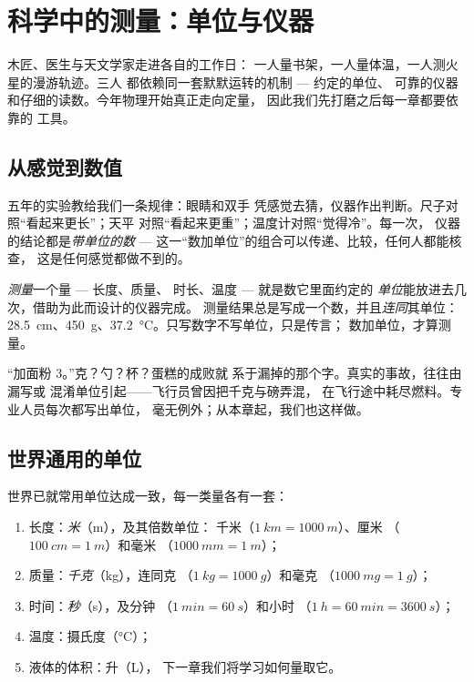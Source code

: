 \chapter{科学中的测量：单位与仪器}\label{ch:g6:measurement-in-science}

木匠、医生与天文学家走进各自的工作日：
一人量书架，一人量体温，一人测火星的漫游轨迹。三人
都依赖同一套默默运转的机制 --- 约定的单位、
可靠的仪器和仔细的读数。今年物理开始真正走向定量，
因此我们先打磨之后每一章都要依靠的
工具。

\section{从感觉到数值}

五年的实验教给我们一条规律：眼睛和双手
凭感觉去猜，仪器作出判断。尺子对照“看起来更长”；天平
对照“看起来更重”；温度计对照“觉得冷”。每一次，
仪器的结论都是\emph{带单位的数} ---
这一“数加单位”的组合可以传递、比较，任何人都能核查，
这是任何感觉都做不到的。

\begin{definition}[测量一个量]\label{def:g6:measurement-in-science:measuring}
\emph{测量}一个量 --- 长度、质量、
时长、温度 --- 就是数它里面约定的
\emph{单位}能放进去几次，借助为此而设计的仪器完成。
测量结果总是写成一个数，并且\emph{连同}其单位：
\qty{28.5}{cm}、\qty{450}{g}、\qty{37.2}{\celsius}。只写数字不写单位，只是传言；
数加单位，才算测量。
\end{definition}

\begin{example}[漏写单位的代价]\label{ex:g6:measurement-in-science:missing}
“加面粉 3。”克？勺？杯？蛋糕的成败就
系于漏掉的那个字。真实的事故，往往由漏写或
混淆单位引起——飞行员曾因把千克与磅弄混，
在飞行途中耗尽燃料。专业人员每次都写出单位，
毫无例外；从本章起，我们也这样做。
\end{example}

\section{世界通用的单位}

\begin{definition}[科学家的入门工具包]\label{def:g6:measurement-in-science:units}
世界已就常用单位达成一致，每一类量各有一套：
\begin{enumerate}
  \item 长度：\emph{米}（\unit{m}），及其倍数单位：
        千米（$\qty{1}{km} = \qty{1000}{m}$）、厘米
        （$\qty{100}{cm} = \qty{1}{m}$）和毫米
        （$\qty{1000}{mm} = \qty{1}{m}$）；
  \item 质量：\emph{千克}（\unit{kg}），连同克
        （$\qty{1}{kg} = \qty{1000}{g}$）和毫克
        （$\qty{1000}{mg} = \qty{1}{g}$）；
  \item 时间：\emph{秒}（\unit{s}），及分钟
        （$\qty{1}{min} = \qty{60}{s}$）和小时
        （$\qty{1}{h} = \qty{60}{min} = \qty{3600}{s}$）；
  \item 温度：摄氏度（\unit{\celsius}）；
  \item 液体的体积：升（\unit{L}），
        下一章我们将学习如何量取它。
\end{enumerate}
\end{definition}

